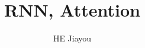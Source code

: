 \documentclass[]{beamer}
\title[ls]{RNN, Attention}
\author[hejiayou]{HE Jiayou}
\begin{document}
\frame{\titlepage}
\end{document}
